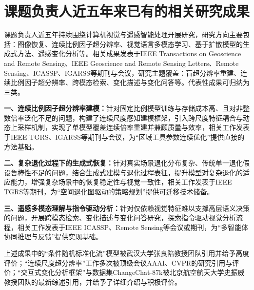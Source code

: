 \section{课题负责人近五年来已有的相关研究成果}

课题负责人近五年持续围绕计算机视觉与遥感智能处理开展研究，研究方向主要包括：图像恢复、连续比例因子超分辨率、视觉语言多模态学习、基于扩散模型的生成式方法、遥感变化分析等。相关成果发表于IEEE Transactions on Geoscience and Remote Sensing、IEEE Geoscience and Remote Sensing Letters、Remote Sensing、ICASSP、IGARSS等期刊与会议，研究主题覆盖：盲超分辨率重建、连续比例因子超分辨率、跨模态检索、变化描述与变化问答等。代表性成果可归纳为三类。

\textbf{一、连续比例因子超分辨率建模：}针对固定比例模型训练与存储成本高、且对非整数倍率泛化不足的问题，构建了连续尺度感知建模框架，引入跨尺度特征耦合与动态上采样机制，实现了单模型覆盖连续倍率重建并兼顾质量与效率，相关工作发表于IEEE TGRS、IGARSS等期刊与会议，为“区域工具参数连续优化”提供直接的方法基础。

\textbf{二、复杂退化过程下的生成式恢复：}针对真实场景退化分布复杂、传统单一退化假设鲁棒性不足的问题，结合生成式建模与退化过程表征，提升模型对复杂退化的适应能力，增强复杂场景中的恢复稳定性与视觉一致性，相关工作发表于IEEE TGRS等期刊，为“空间退化图驱动的策略规划”提供可迁移技术储备。

\textbf{三、遥感多模态理解与指令驱动分析：}针对仅依赖视觉特征难以支撑高层语义决策的问题，开展跨模态检索、变化描述与变化问答研究，探索指令驱动视觉分析流程，相关工作发表于IEEE ICASSP、Remote Sensing等会议或期刊，为“多智能体协同推理与反馈”提供实现基础。

上述成果中的“条件随机标准化流”模型被武汉大学张良陪教授团队引用并给予高度评价；“连续尺度超分辨率”工作多次被顶级会议AAAI、CVPR的研究引用与评价；“交互式变化分析框架”与数据集ChangeChat-87k被北京航空航天大学史振威教授团队的最新综述引用，并给予了详细介绍与积极评价。